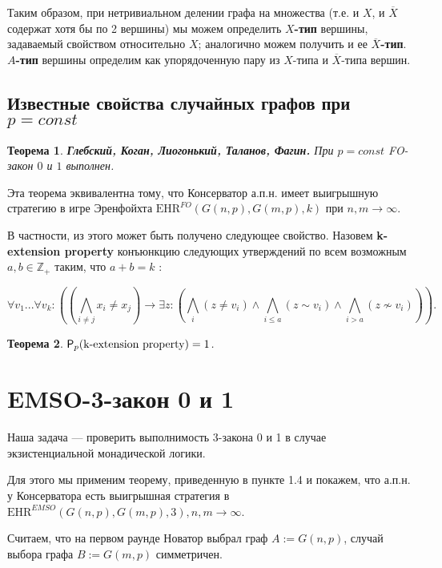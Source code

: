 \documentclass{article}
\newtheorem*{thm}{Теорема}
\begin{document}
	Таким образом, при нетривиальном делении графа на множества (т.е. и $X$, и $\overline{X}$ содержат хотя бы по 2 вершины) мы можем определить \textbf{$X$-тип} вершины, задаваемый свойством относительно $X$; аналогично можем получить и ее \textbf{$\overline{X}$-тип}. {\bf $A$-тип} вершины определим как упорядоченную пару из $X$-типа и $\overline{X}$-типа вершин.
	
	\subsection{Известные свойства случайных графов при $p = const$}
	
	\begin{thm}
		\textbf{Глебский, Коган, Лиогонький, Таланов, Фагин.} При $p = const$ FO-закон $0$ и $1$ выполнен.
	\end{thm}	
	
	Эта теорема эквивалентна тому, что Консерватор а.п.н. имеет выигрышную стратегию в игре Эренфойхта $\textrm{EHR}^{FO}({G}(n, p), {G}(m, p), k)$ при $n, m \to \infty$. 
	
	В частности, из этого может быть получено следующее свойство. Назовем \textbf{k-extension property} конъюнкцию следующих утверждений по всем возможным $a, b \in \mathbb{Z_{+}}$ таким, что $a + b = k$ :
	
	$$\forall v_1 ... \forall v_k: \left( \left(\bigwedge_{i \neq j} x_i \neq x_j \right) \rightarrow \exists z: \left( \bigwedge_{i} (z \neq v_i) \land \bigwedge_{i \leq a} (z \sim v_i) \land \bigwedge_{i > a} (z \nsim v_i) \right) \right).$$
	
	\begin{thm}
		${\sf P}_{p} (\textrm{k-extension property}) = 1$.
	\end{thm}

	\section{EMSO-3-закон 0 и 1}
	
	Наша задача --- проверить выполнимость 3-закона 0 и 1 в случае экзистенциальной монадической логики.
	
	Для этого мы применим теорему, приведенную в пункте 1.4 и покажем, что а.п.н. у Консерватора есть выигрышная стратегия в $\textrm{EHR}^{EMSO}({G}(n, p), {G}(m, p), 3), n, m \to \infty$.
	
	Считаем, что на первом раунде Новатор выбрал граф $A := G(n,p)$, случай выбора графа $B := G(m, p)$ симметричен.
	
\end{document}
